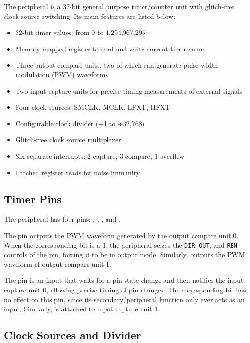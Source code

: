 The  peripheral is a 32-bit general purpose timer/counter unit with glitch-free clock source switching. Its main features are listed below:

\begin{itemize}
	\item 32-bit timer values, from 0 to 4,294,967,295
	\item Memory mapped register to read and write current timer value
	\item Three output compare units, two of which can generate pulse width modulation (PWM) waveforms
	\item Two input capture units for precise timing measurements of external signals
	\item Four clock sources: SMCLK, MCLK, LFXT, HFXT
	\item Configurable clock divider (÷1 to ÷32,768)
	\item Glitch-free clock source multiplexer
	\item Six separate interrupts: 2 capture, 3 compare, 1 overflow
	\item Latched register reads for noise immunity
\end{itemize}



\subsection{Timer Pins}

The  peripheral has four pins: , , , and .

The  pin outputs the PWM waveform generated by the output compare unit 0. When the corresponding  bit is a 1, the  peripheral seizes the \texttt{DIR}, \texttt{OUT}, and \texttt{REN} controls of the pin, forcing it to be in output mode. Similarly,  outputs the PWM waveform of output compare unit 1.

The  pin is an input that waits for a pin state change and then notifies the input capture unit 0, allowing precise timing of pin changes. The corresponding  bit has no effect on this pin, since its secondary/peripheral function only ever acts as an input. Similarly,  is attached to input capture unit 1.



\subsection{Clock Sources and Divider}

